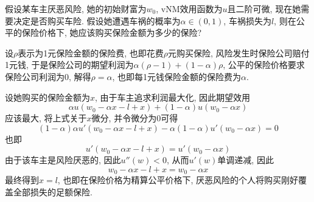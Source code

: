 \documentclass[cn, 12pt, math=mtpro2, bibstyle=apa, blue]{elegantbook}
\begin{document}
\begin{example}
假设某车主厌恶风险, 她的初始财富为$w_0$, vNM效用函数为$u$且二阶可微, 现在她需要决定是否购买车险. 假设她遭遇车祸的概率为$\alpha\in(0,1)$, 车祸损失为$l$, 则在公平的保险价格下, 她应该购买保险金额为多少的保险?

设$\rho$表示为1元保险金额的保险费, 也即花费$\rho$元购买保险, 风险发生时保险公司赔付1元钱, 于是保险公司的期望利润为$\alpha(\rho-1)+(1-\alpha)\rho$, 公平的保险价格要求保险公司利润为0, 解得$\rho=\alpha$, 也即每1元钱保险金额的保险费为$\alpha$.

设她购买的保险金额为$x$, 由于车主追求利润最大化, 因此期望效用
$$\alpha u(w_0-\alpha x-l+x)+(1-\alpha)u(w_0-\alpha x)$$
应该最大, 将上式关于$x$微分, 并令微分为0可得
$$(1-\alpha)\alpha u'(w_0-\alpha x-l+x)-\alpha(1-\alpha)u'(w_0-\alpha x)=0$$
也即
$$u'(w_0-\alpha x-l+x)=u'(w_0-\alpha x)$$
由于该车主是风险厌恶的, 因此$u''(w)<0$, 从而$u'(w)$单调递减, 因此
$$w_0-\alpha x-l+x=w_0-\alpha x$$
最终得到$x=l$, 也即在保险价格为精算公平价格下, 厌恶风险的个人将购买刚好覆盖全部损失的足额保险.
\end{example}
\end{document}

